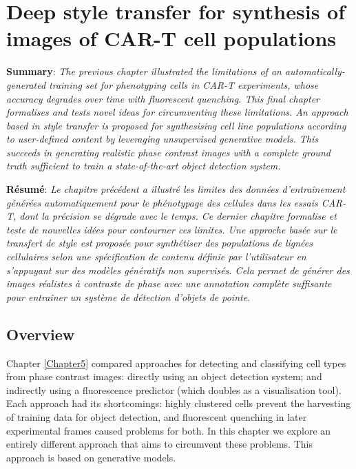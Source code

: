 
\chapter{Deep style transfer for synthesis of images of CAR-T cell populations} %

\label{Chapter6} %

\textbf{Summary}: \emph{The previous chapter illustrated the limitations of an automatically-generated training set for phenotyping cells in CAR-T experiments, whose accuracy degrades over time with fluorescent quenching. This final chapter formalises and tests novel ideas for circumventing these limitations. An approach based in style transfer is proposed for synthesising cell line populations according to user-defined content by leveraging unsupervised generative models. This succeeds in generating realistic phase contrast images with a complete ground truth sufficient to train a state-of-the-art object detection system.}

\textbf{R\'esum\'e}: \emph{Le chapitre pr\'ec\'edent a illustr\'e les limites des donn\'ees d'entra\^inement g\'en\'er\'ees automatiquement pour le ph\'enotypage des cellules dans les essais CAR-T, dont la pr\'ecision se d\'egrade avec le temps. Ce dernier chapitre formalise et teste de nouvelles id\'ees pour contourner ces limites. Une approche bas\'ee sur le transfert de style est propos\'ee pour synth\'etiser des populations de lign\'ees cellulaires selon une sp\'ecification de contenu d\'efinie par l'utilisateur en s'appuyant sur des mod\`eles g\'en\'eratifs non supervis\'es. Cela permet de g\'en\'erer des images r\'ealistes \`a contraste de phase avec une annotation compl\`ete suffisante pour entra\^iner un syst\`eme de d\'etection d'objets de pointe.}

\section{Overview}

Chapter \ref{Chapter5} compared approaches for detecting and classifying cell types from phase contrast images: directly using an object detection system; and indirectly using a fluorescence predictor (which doubles as a visualisation tool). Each approach had its shortcomings: highly clustered cells prevent the harvesting of training data for object detection, and fluorescent quenching in later experimental frames caused problems for both. In this chapter we explore an entirely different approach that aims to circumvent these problems. This approach is based on generative models.

